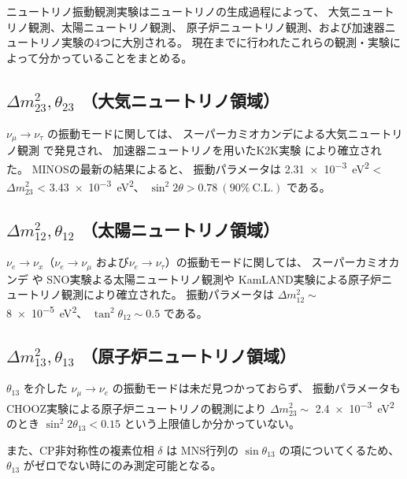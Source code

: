 ニュートリノ振動観測実験はニュートリノの生成過程によって、
大気ニュートリノ観測、太陽ニュートリノ観測、
原子炉ニュートリノ観測、および加速器ニュートリノ実験の4つに大別される。
現在までに行われたこれらの観測・実験によって分かっていることをまとめる。


\subsection{$\Delta m_{23}^{2}, \theta_{23}$ （大気ニュートリノ領域）}

$\nu_{\mu} \rightarrow \nu_{\tau}$ の振動モードに関しては、
スーパーカミオカンデによる大気ニュートリノ観測 \cite{ashie_measurement_2005} で発見され、
加速器ニュートリノを用いたK2K実験 \cite{ahn_measurement_2006} により確立された。
MINOSの最新の結果\cite{michael_observation_2006}によると、
振動パラメータは
\qty{2.31e-3}{\eV\squared} < $\Delta m_{23}^{2}$ < \qty{3.43e-3}{\eV\squared}、
$\sin^{2} 2 \theta > 0.78\ (90 \%\ \mathrm{C.L.})$ である。

\subsection{$\Delta m_{12}^{2}, \theta_{12}$ （太陽ニュートリノ領域）}

$\nu_{e} \rightarrow \nu_{x}$（$\nu_{e} \rightarrow \nu_{\mu}$
および$\nu_{e} \rightarrow \nu_{\tau}$）の振動モードに関しては、
スーパーカミオカンデ \cite{hosaka_solar_2006}や SNO実験\cite{aharmim_electron_2005}よる太陽ニュートリノ観測や
KamLAND実験\cite{abe_precision_2008}による原子炉ニュートリノ観測により確立された。
振動パラメータは
$\Delta m_{12}^{2} \sim$ \qty{8e-5}{\eV\squared}、
$\tan^{2}\theta_{12} \sim 0.5$ である。

\subsection{$\Delta m_{13}^{2}, \theta_{13}$ （原子炉ニュートリノ領域）}

$\theta_{13}$ を介した
$\nu_{\mu} \rightarrow \nu_{e}$ の振動モードは未だ見つかっておらず、
振動パラメータもCHOOZ実験による原子炉ニュートリノの観測\cite{apollonio_search_2003}により
$\Delta m_{23}^{2} \sim$ \qty{2.4e-3}{\eV\squared} のとき
$\sin^{2} 2 \theta_{13} < 0.15$ という上限値しか分かっていない。

また、CP非対称性の複素位相 $\delta$ は
MNS行列の $\sin \theta_{13}$ の項についてくるため、
$\theta_{13}$ がゼロでない時にのみ測定可能となる。
